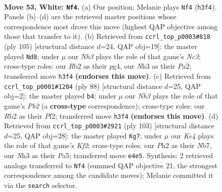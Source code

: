\documentclass[11pt]{article}
\begin{document}
\clearpage

\begin{figure}[p]\centering
\begin{subfigure}{0.46\textwidth}\centering
\resizebox{\linewidth}{!}{%
\newchessgame
\chessboard[
  setfen={3r4/4kp2/7r/p7/3pK3/1P5N/1R5P/2R5 w - - 0 53},
  showmover=false,
  pgfstyle=straightmove, color=movearrow, markmove={h3-f4}
]}
\caption{}
\end{subfigure}\hfill
\begin{subfigure}{0.46\textwidth}\centering
\resizebox{\linewidth}{!}{%
\newchessgame
\chessboard[
  setfen={8/4k3/r1n4p/8/6PP/4P1K1/p1R5/B7 b - - 11 53},
  showmover=false,
  pgfstyle=straightmove, color=movearrow, markmove={c6-d8}
]}
\caption{}
\end{subfigure}
\\[4pt]
\begin{subfigure}{0.46\textwidth}\centering
\resizebox{\linewidth}{!}{%
\newchessgame
\chessboard[
  setfen={1r6/8/4k3/4ppp1/2K5/6P1/1P1R1P2/8 w - - 2 45},
  showmover=false,
  pgfstyle=straightmove, color=movearrow, markmove={b2-b4}
]}
\caption{}
\end{subfigure}\hfill
\begin{subfigure}{0.46\textwidth}\centering
\resizebox{\linewidth}{!}{%
\newchessgame
\chessboard[
  setfen={8/1n3k2/R7/pr1P2pp/2N5/7P/5PK1/8 b - - 17 52},
  showmover=false,
  pgfstyle=straightmove, color=movearrow, markmove={f7-g7}
]}
\caption{}
\end{subfigure}
\caption{\textbf{Move 53, White: \texttt{Nf4}.} (a) Our position; Melanie plays \texttt{Nf4} (\texttt{h3f4}). Panels (b)--(d) are the retrieved master positions whose correspondence most drove this move (highest QAP objective among those that transfer to it). (b) Retrieved from \texttt{ccrl\_top\_p0003\#818} (ply 105) [structural distance $d$=24, QAP obj=19]: the master played \texttt{Nd8}; under $\mu$ our \emph{Nh3} plays the role of that game's \emph{Nc3}; cross-type roles: our \emph{R}b2 as their \emph{p}g4, our \emph{N}h3 as their \emph{P}a2; transferred move \texttt{h3f4} \textbf{(endorses this move)}. (c) Retrieved from \texttt{ccrl\_top\_p0001\#1204} (ply 88) [structural distance $d$=25, QAP obj=2]: the master played \texttt{b4}; under $\mu$ our \emph{Nh3} plays the role of that game's \emph{Pb2} (a \textbf{cross-type} correspondence); cross-type roles: our \emph{R}b2 as their \emph{P}f2; transferred move \texttt{h3f4} \textbf{(endorses this move)}. (d) Retrieved from \texttt{ccrl\_top\_p0003\#2921} (ply 103) [structural distance $d$=25, QAP obj=28]: the master played \texttt{Kg7}; under $\mu$ our \emph{Ke4} plays the role of that game's \emph{Kf2}; cross-type roles: our \emph{P}h2 as their \emph{N}b7, our \emph{N}h3 as their \emph{P}a5; transferred move \texttt{e4e5}. Synthesis: 2 retrieved analogs transferred to \texttt{Nf4} (summed QAP objective 21, the strongest correspondence among the candidate moves); Melanie committed it via the \texttt{search} selector.}
\label{fig:thought-m104}
\end{figure}
\end{document}
